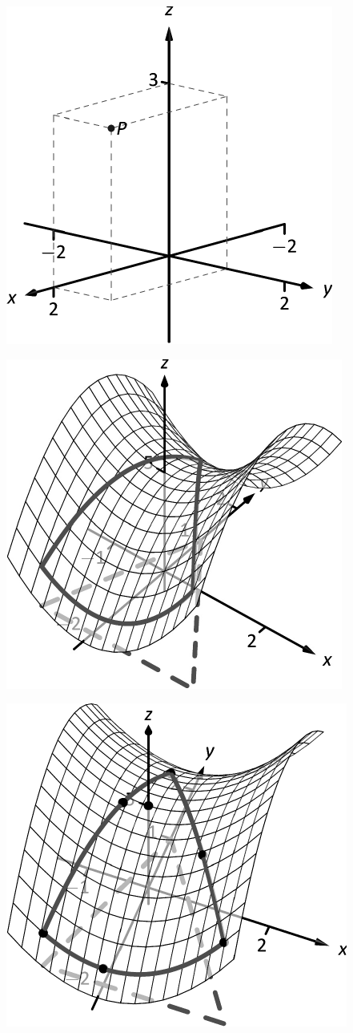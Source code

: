 \documentclass[10pt]{article}
\begin{document}
\includegraphics{figcartcoord2_3DBW.pdf}
\texttt{}

\includegraphics{figconopt1_3DBW.pdf}
\texttt{}

\includegraphics{figconopt1c_3DBW.pdf}
\texttt{}
\end{document}
